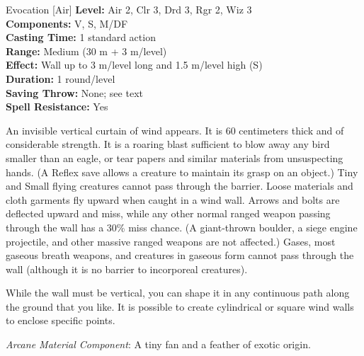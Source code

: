 {Evocation [Air]}
{
	\textbf{Level:}
	Air 2, Clr 3, Drd 3, Rgr 2, Wiz 3\\
	\textbf{Components:}
	V, S, M/DF\\
	\textbf{Casting Time:}
	1 standard action\\
	\textbf{Range:}
	Medium (30 m + 3 m/level)\\
	\textbf{Effect:}
	Wall up to 3 m/level long and 1.5 m/level high (S)\\
	\textbf{Duration:}
	1 round/level\\
	\textbf{Saving Throw:}
	None; see text\\
	\textbf{Spell Resistance:}
	Yes\\
}
{
	An invisible vertical curtain of wind appears. It is 60 centimeters thick and of considerable strength. It is a roaring blast sufficient to blow away any bird smaller than an eagle, or tear papers and similar materials from unsuspecting hands. (A Reflex save allows a creature to maintain its grasp on an object.) Tiny and Small flying creatures cannot pass through the barrier. Loose materials and cloth garments fly upward when caught in a wind wall. Arrows and bolts are deflected upward and miss, while any other normal ranged weapon passing through the wall has a 30\% miss chance. (A giant-thrown boulder, a siege engine projectile, and other massive ranged weapons are not affected.) Gases, most gaseous breath weapons, and creatures in gaseous form cannot pass through the wall (although it is no barrier to incorporeal creatures).

	While the wall must be vertical, you can shape it in any continuous path along the ground that you like. It is possible to create cylindrical or square wind walls to enclose specific points.

	\textit{Arcane Material Component}:
	A tiny fan and a feather of exotic origin.

}
